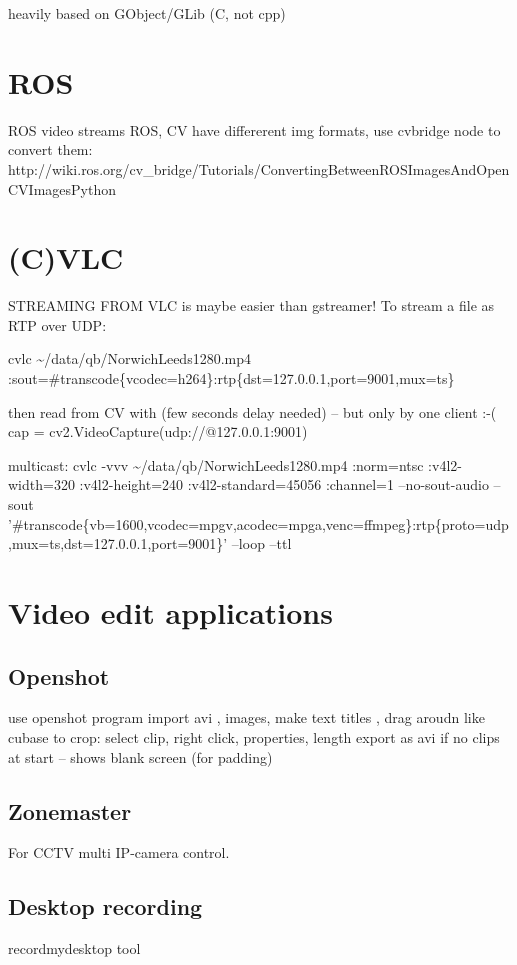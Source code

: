 \documentclass[oneside,english]{scrbook}
\begin{document}
heavily based on GObject/GLib (C, not cpp)



\chapter{ROS}

ROS video streams ROS, CV have differerent img formats, use cvbridge
node to convert them: http://wiki.ros.org/cv\_bridge/Tutorials/ConvertingBetweenROSImagesAndOpenCVImagesPython


\chapter{(C)VLC}

STREAMING FROM VLC is maybe easier than gstreamer! To stream a file
as RTP over UDP:

cvlc \textasciitilde{}/data/qb/NorwichLeeds1280.mp4 :sout=\#transcode\{vcodec=h264\}:\textquotedbl{}rtp\{dst=127.0.0.1,port=9001,mux=ts\}\textquotedbl{}

then read from CV with (few seconds delay needed) -- but only by one
client :-( cap = cv2.VideoCapture(\textquotedbl{}udp://@127.0.0.1:9001\textquotedbl{})

multicast: cvlc -vvv \textasciitilde{}/data/qb/NorwichLeeds1280.mp4
:norm=ntsc :v4l2-width=320 :v4l2-height=240 :v4l2-standard=45056 :channel=1
--no-sout-audio --sout '\#transcode\{vb=\textquotedbl{}1600\textquotedbl{},vcodec=mpgv,acodec=mpga,venc=ffmpeg\}:rtp\{proto=udp,mux=ts,dst=127.0.0.1,port=9001\}'
--loop --ttl 

\chapter{Video edit applications}
\section{Openshot}
use openshot program
	import avi , images, make text titles , drag aroudn like cubase
	to crop: select clip, right click, properties, length
	export as avi
	if no clips at start -- shows blank screen (for padding)

\section{Zonemaster}
For CCTV multi IP-camera control.

\section{Desktop recording}
recordmydesktop tool
\end{document}
